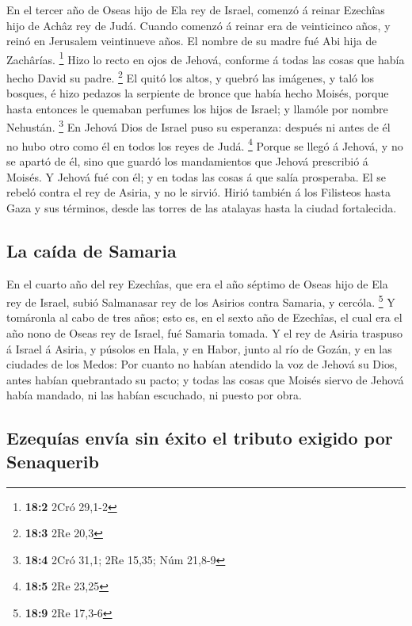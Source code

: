  En el tercer año de Oseas hijo de Ela rey de Israel,
comenzó á reinar Ezechîas hijo de Achâz rey de Judá. 
Cuando comenzó á reinar era de veinticinco años, y reinó en Jerusalem
veintinueve años. El nombre de su madre fué Abi hija de Zachârías.
\footnote{\textbf{18:2} 2Cró 29,1-2}  Hizo lo recto en
ojos de Jehová, conforme á todas las cosas que había hecho David su
padre. \footnote{\textbf{18:3} 2Re 20,3}  El quitó los
altos, y quebró las imágenes, y taló los bosques, é hizo pedazos la
serpiente de bronce que había hecho Moisés, porque hasta entonces le
quemaban perfumes los hijos de Israel; y llamóle por nombre Nehustán.
\footnote{\textbf{18:4} 2Cró 31,1; 2Re 15,35; Núm 21,8-9} 
En Jehová Dios de Israel puso su esperanza: después ni antes de él no
hubo otro como él en todos los reyes de Judá. \footnote{\textbf{18:5}
  2Re 23,25}  Porque se llegó á Jehová, y no se apartó de
él, sino que guardó los mandamientos que Jehová prescribió á Moisés.
 Y Jehová fué con él; y en todas las cosas á que salía
prosperaba. El se rebeló contra el rey de Asiria, y no le sirvió.
 Hirió también á los Filisteos hasta Gaza y sus términos,
desde las torres de las atalayas hasta la ciudad fortalecida.

\hypertarget{la-cauxedda-de-samaria}{%
\subsection{La caída de Samaria}\label{la-cauxedda-de-samaria}}

 En el cuarto año del rey Ezechîas, que era el año séptimo
de Oseas hijo de Ela rey de Israel, subió Salmanasar rey de los Asirios
contra Samaria, y cercóla. \footnote{\textbf{18:9} 2Re 17,3-6}
 Y tomáronla al cabo de tres años; esto es, en el sexto
año de Ezechîas, el cual era el año nono de Oseas rey de Israel, fué
Samaria tomada.  Y el rey de Asiria traspuso á Israel á
Asiria, y púsolos en Hala, y en Habor, junto al río de Gozán, y en las
ciudades de los Medos:  Por cuanto no habían atendido la
voz de Jehová su Dios, antes habían quebrantado su pacto; y todas las
cosas que Moisés siervo de Jehová había mandado, ni las habían
escuchado, ni puesto por obra.

\hypertarget{ezequuxedas-envuxeda-sin-uxe9xito-el-tributo-exigido-por-senaquerib}{%
\subsection{Ezequías envía sin éxito el tributo exigido por
Senaquerib}\label{ezequuxedas-envuxeda-sin-uxe9xito-el-tributo-exigido-por-senaquerib}}

